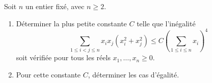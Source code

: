 Soit $n$ un entier fixé, avec $n \geq 2$.
\begin{enumerate}
\item Déterminer la plus petite constante $C$ telle que l'inégalité
\[
\sum_{1 \leq i < j \leq n} x_i x_j (x_i^2 + x_j^2)
\leq C \left(\sum_{1 \leq i \leq n} x_i\right)^4
\]
soit vérifiée pour tous les réels $x_1, \ldots, x_n \geq 0$.
\item Pour cette constante $C$, déterminer les cas d'égalité.
\end{enumerate}
